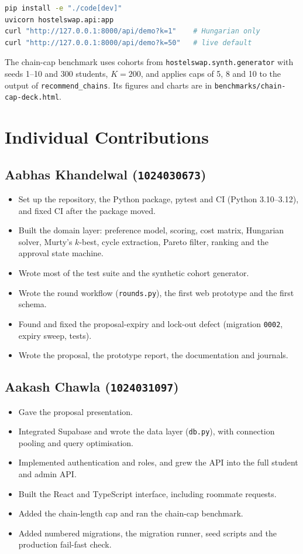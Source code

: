 \begin{lstlisting}[language=bash]
pip install -e "./code[dev]"
uvicorn hostelswap.api:app
curl "http://127.0.0.1:8000/api/demo?k=1"    # Hungarian only
curl "http://127.0.0.1:8000/api/demo?k=50"   # live default
\end{lstlisting}

The chain-cap benchmark uses cohorts from
\texttt{hostelswap.synth.generator} with seeds 1--10 and 300 students,
$K = 200$, and applies caps of 5, 8 and 10 to the output of
\texttt{recommend\_chains}. Its figures and charts are in
\texttt{benchmarks/chain-cap-deck.html}.

\chapter{Individual Contributions}
\label{app:contrib}

\section*{Aabhas Khandelwal (\texttt{1024030673})}
\begin{itemize}
  \item Set up the repository, the Python package, pytest and CI
  (Python 3.10--3.12), and fixed CI after the package moved.
  \item Built the domain layer: preference model, scoring, cost matrix,
  Hungarian solver, Murty's $k$-best, cycle extraction, Pareto filter,
  ranking and the approval state machine.
  \item Wrote most of the test suite and the synthetic cohort generator.
  \item Wrote the round workflow (\texttt{rounds.py}), the first web
  prototype and the first schema.
  \item Found and fixed the proposal-expiry and lock-out defect
  (migration \texttt{0002}, expiry sweep, tests).
  \item Wrote the proposal, the prototype report, the documentation and
  journals.
\end{itemize}

\section*{Aakash Chawla (\texttt{1024031097})}
\begin{itemize}
  \item Gave the proposal presentation.
  \item Integrated Supabase and wrote the data layer (\texttt{db.py}),
  with connection pooling and query optimisation.
  \item Implemented authentication and roles, and grew the API into the
  full student and admin API.
  \item Built the React and TypeScript interface, including roommate
  requests.
  \item Added the chain-length cap and ran the chain-cap benchmark.
  \item Added numbered migrations, the migration runner, seed scripts
  and the production fail-fast check.
\end{itemize}

